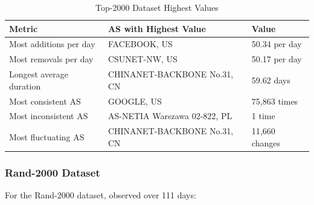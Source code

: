 \documentclass[12pt]{cwru_thesis}
\begin{document}
\begin{table}[h!]
    \centering
    \begin{tabular}{|l|l|l|}
        \hline
        \textbf{Metric} & \textbf{AS with Highest Value} & \textbf{Value} \\
        \hline
        Most additions per day & FACEBOOK, US & 50.34 per day \\
        \hline
        Most removals per day & CSUNET-NW, US & 50.17 per day \\
        \hline
        Longest average duration & CHINANET-BACKBONE No.31, CN & 59.62 days \\
        \hline
        Most consistent AS & GOOGLE, US & 75,863 times \\
        \hline
        Most inconsistent AS & AS-NETIA Warszawa 02-822, PL & 1 time \\
        \hline
        Most fluctuating AS & CHINANET-BACKBONE No.31, CN & 11,660 changes \\
        \hline
    \end{tabular}
    \caption{Top-2000 Dataset Highest Values}
    \label{tab:top-2000-highest}
\end{table}

\subsubsection{Rand-2000 Dataset}

For the Rand-2000 dataset, observed over 111 days:
\end{document}
